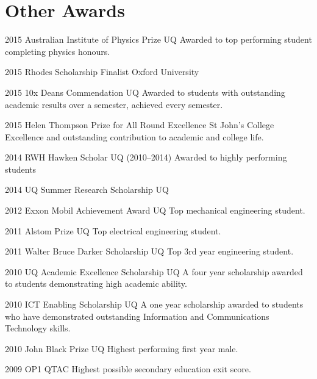 \documentclass[]{friggeri-cv} %
\begin{document}
\section{Other Awards}
\begin{entrylist}
	\entryInlineSmall
	{2015}
	{Australian Institute of Physics Prize}
	{UQ}
	{Awarded to top performing student completing physics honours.}
\end{entrylist}
\begin{entrylist}
	\entryInlineSmall
	{2015}
	{Rhodes Scholarship Finalist}
	{Oxford University}
	{}
\end{entrylist}
\begin{entrylist}
\entryInlineSmall
{2015}
{10x Deans Commendation}
{UQ}
{Awarded to students with outstanding academic results over a semester, achieved every semester.}
\end{entrylist}
\begin{entrylist}
\entryInlineSmall
{2015}
{Helen Thompson Prize for All Round Excellence}
{St John's College}
{Excellence and outstanding contribution to academic and college life.}
\end{entrylist}
\begin{entrylist}
	\entryInline
	{2014}
	{RWH Hawken Scholar}
	{UQ}
	{(2010--2014) Awarded to highly performing students}
\end{entrylist}
\begin{entrylist}
\entryInlineSmall
{2014}
{UQ Summer Research Scholarship}
{UQ}
{}
\end{entrylist}
\begin{entrylist}
\entryInline
{2012}
{Exxon Mobil Achievement Award}
{UQ}
{Top mechanical engineering student.}
\end{entrylist}
\begin{entrylist}
\entryInline
{2011}
{Alstom Prize}
{UQ}
{Top electrical engineering student.}
\end{entrylist}
\begin{entrylist}
\entryInline
{2011}
{Walter Bruce Darker Scholarship}
{UQ}
{Top 3rd year engineering student.}
\end{entrylist}
\begin{entrylist}
\entryInlineSmall
{2010}
{UQ Academic Excellence Scholarship}
{UQ}
{A four year scholarship awarded to students demonstrating high academic ability.}
\end{entrylist}
\begin{entrylist}
\entryInlineSmall
{2010}
{ICT Enabling Scholarship}
{UQ}
{A one year scholarship awarded to students who have demonstrated outstanding Information and Communications Technology skills.}
\end{entrylist}
\begin{entrylist}
\entryInline
{2010}
{John Black Prize}
{UQ}
{Highest performing first year male.}
\end{entrylist}
\begin{entrylist}
\entryInline
{2009}
{OP1}
{QTAC}
{Highest possible secondary education exit score.}
\end{entrylist}
\end{document}
